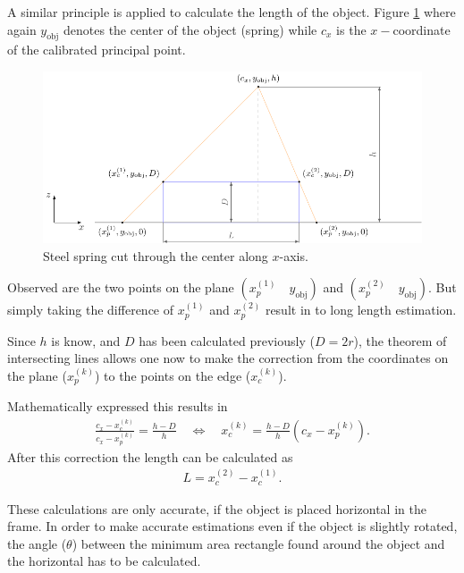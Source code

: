 A similar principle is applied to calculate the length of the object.
Figure \ref{development:length} where again
$y_{\text{obj}}$ denotes the center of the object (spring) while $c_x$ is the $x-$coordinate of the calibrated principal point.
\begin{figure}[ht]
	\centering
	\includegraphics[width=0.9\linewidth]{3-development/software/images/length_estimation.pdf}
	\caption{Steel spring cut through the center along $x$-axis.\label{development:length}}
\end{figure}
Observed are the two points on the plane $(x_p^{(1)}\quad y_{\text{obj}})$ and $(x_p^{(2)}\quad y_{\text{obj}})$.
But simply taking the difference of $x_p^{(1)}$ and $x_p^{(2)}$ result in to long length estimation.

Since $h$ is know, and $D$ has been calculated previously ($D=2r$), the theorem of intersecting lines allows one now to make the correction from the coordinates on the plane ($x_p^{(k)}$) to the points on the edge ($x_c^{(k)}$).

Mathematically expressed this results in
\begin{align*}
	\frac{c_x-x_c^{(k)}}{c_x-x_p^{(k)}}=\frac{h-D}{h}\quad\Leftrightarrow\quad
	x_c^{(k)}=\frac{h-D}{h}(c_x-x_p^{(k)}).
\end{align*}
After this correction the length can be calculated as
\begin{align*}
	L=x_c^{(2)}-x_c^{(1)}.
\end{align*}

These calculations are only accurate, if the object is placed horizontal in the frame.
In order to make accurate estimations even if the object is slightly rotated, the angle ($\theta$) between the minimum area rectangle found around the object and the horizontal has to be calculated.

